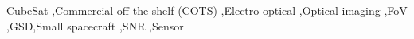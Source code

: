 \documentclass[final,5p,times,twocolumn]{elsarticle}
\begin{document}
\begin{frontmatter}

\begin{keyword}
	CubeSat \sep Commercial-off-the-shelf (COTS) \sep  Electro-optical \sep Optical imaging  \sep  FoV \sep GSD\sep Small spacecraft \sep  SNR \sep  Sensor 

\end{keyword}
\end{frontmatter}


\end{document}
